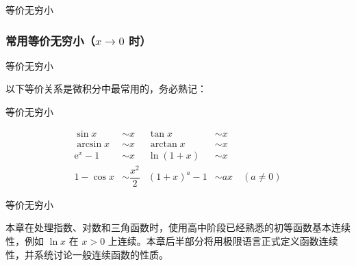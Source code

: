 \documentclass[aspectratio=169,10pt,fontset=fandol]{ctexbeamer}
\newenvironment{custom}[1]{\par\noindent\textbf{#1}\quad}{\par\vspace{0.8em}}
\newcommand{\ee}{\mathrm{e}}
\begin{document}
\begin{frame}[t,fragile]{等价无穷小}
\footnotesize
{\footnotesize
\subsubsection{\texorpdfstring{常用等价无穷小（\(x \to 0\) 时）}{常用等价无穷小（x 趋于 0 时）}}


}
\end{frame}
\begin{frame}[t,fragile]{等价无穷小}
\footnotesize
{\footnotesize
以下等价关系是微积分中最常用的，务必熟记：


}
\end{frame}
\begin{frame}[t,fragile]{等价无穷小}
\footnotesize
{\footnotesize
\[
\boxed{
\begin{aligned}
\sin x &\sim x & \tan x &\sim x \\
\arcsin x &\sim x & \arctan x &\sim x \\
\ee^x - 1 &\sim x & \ln(1+x) &\sim x \\
1 - \cos x &\sim \dfrac{x^2}{2} & (1+x)^a - 1 &\sim ax \quad (a \neq 0)
\end{aligned}
}
\]


}
\end{frame}
\begin{frame}[t,fragile]{等价无穷小}
\footnotesize
{\footnotesize
本章在处理指数、对数和三角函数时，使用高中阶段已经熟悉的初等函数基本连续性，例如 $\ln x$ 在 $x>0$ 上连续。本章后半部分将用极限语言正式定义函数连续性，并系统讨论一般连续函数的性质。

}
\end{frame}
\end{document}
